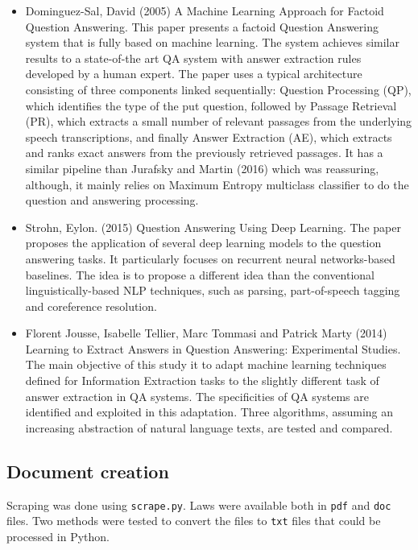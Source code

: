 \documentclass[letterpaper, margin=1in]{article}
\begin{document}
\begin{itemize}

\item Dominguez-Sal, David (2005) A Machine Learning Approach for Factoid Question Answering. This paper presents a factoid Question Answering system that is fully based on machine learning. The system achieves similar results to a state-of-the art QA system with answer extraction rules developed by a human expert. The paper uses a typical architecture consisting of three components linked sequentially: Question Processing (QP), which identifies the type of the put question, followed by Passage Retrieval (PR), which extracts a small number of relevant passages from the underlying speech transcriptions, and finally Answer Extraction (AE), which extracts and ranks exact answers from the previously retrieved passages. It has a similar pipeline than Jurafsky and Martin (2016) which was reassuring, although, it mainly relies on Maximum Entropy multiclass classifier to do the question and answering processing.
\item  Strohn, Eylon. (2015) Question Answering Using Deep Learning. The paper proposes the application of several deep learning models to the question answering tasks. It particularly focuses on recurrent neural networks-based baselines. The idea is to propose a different idea than the conventional linguistically-based NLP techniques, such as parsing, part-of-speech tagging and coreference resolution.
\item  Florent Jousse, Isabelle Tellier, Marc Tommasi and Patrick Marty (2014) Learning to Extract Answers in Question Answering: Experimental Studies. The main objective of this study it to adapt machine learning techniques defined for Information Extraction tasks to the slightly different task of answer extraction in QA systems. The specificities of QA systems are identified and exploited in this adaptation. Three algorithms, assuming an increasing abstraction of natural language texts, are tested and compared.
\end{itemize}


\subsection{Document creation}
Scraping was done using \texttt{scrape.py}. Laws were available both in \texttt{pdf} and \texttt{doc} files. Two methods were tested to convert the files to \texttt{txt} files that could be processed in Python. 
\end{document}
